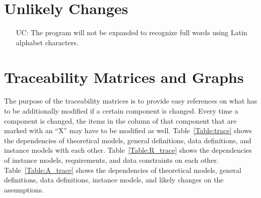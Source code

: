 \documentclass[12pt]{article}
\newcounter{ucnum} %
\begin{document}
\section{Unlikely Changes}    

\noindent \begin{itemize}

\item[UC\refstepcounter{ucnum}\theucnum\label{UC_Words}:] The program will not
be expanded to recognize full words using Latin alphabet characters.

\end{itemize}

\section{Traceability Matrices and Graphs}

The purpose of the traceability matrices is to provide easy references on what
has to be additionally modified if a certain component is changed.  Every time a
component is changed, the items in the column of that component that are marked
with an ``X'' may have to be modified as well.  Table~\ref{Table:trace} shows the
dependencies of theoretical models, general definitions, data definitions, and
instance models with each other. Table~\ref{Table:R_trace} shows the
dependencies of instance models, requirements, and data constraints on each
other. Table~\ref{Table:A_trace} shows the dependencies of theoretical models,
general definitions, data definitions, instance models, and likely changes on
the assumptions.



\end{document}
